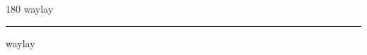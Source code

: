 
\begin{frame}
\begin{center}
\begin{turn}{180}
{\fontsize{2.5cm}{1em}\selectfont waylay}
\end{turn}
\vspace{1em}\par  
\hrule
\vspace{1em}\par  
{\fontsize{2.5cm}{1em}\selectfont waylay}
\end{center}
\end{frame}
